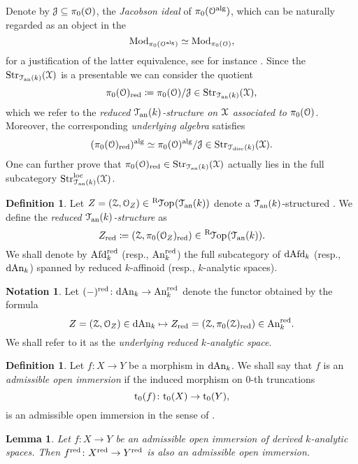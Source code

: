 \documentclass[10pt,a4paper,reqno]{amsart} %
\theoremstyle{plain}
\newtheorem{lem}[thm]{Lemma}
\theoremstyle{definition}
\newtheorem{defin}[thm]{Definition}
\newtheorem{notation}[thm]{Notation}
\theoremstyle{remark}
\numberwithin{equation}{section}
\begin{document}
Denote by $\mathcal J \subseteq \pi_0(\mathcal O)$, the \emph{Jacobson ideal} of $\pi_0(\mathcal O ^\mathrm{alg})$, which can be naturally regarded as an object
in the \infcat
    \[
        \mathrm{Mod}_{\pi_0(\mathcal O ^\mathrm{alg})} \simeq \mathrm{Mod}_{\pi_0(\mathcal O)},  
    \]
for a justification of the latter equivalence, see for instance \cite[Theorem 4.5]{Porta_Yu_Representability} .
Since the \infcat $\mathrm{Str}_{\mathcal T_{\mathrm{an}}(k)}(\mathcal X)$ is a presentable \infcat we can consider the quotient
    \[
        \pi_0(\mathcal O)_{\mathrm{red}} \coloneqq \pi_0(\mathcal O)/\mathcal J \in \mathrm{Str}_{\mathcal T_{\mathrm{an}}(k)}(\mathcal X)  ,
    \]
which we refer to the \emph{reduced $\mathcal T_{\mathrm{an}}(k)$-structure on $\mathcal X$ associated to $\pi_0(\mathcal O)$}. Moreover, the corresponding \emph{underlying algebra} satisfies
    \[(\pi_0(\mathcal O)_{\mathrm{red}})^\mathrm{alg} \simeq \pi_0(\mathcal O)^\mathrm{alg}/ \mathcal J \in \mathrm{Str}_{\mathcal T_{\mathrm{disc}}(k)}(\mathcal X).\]
One can further prove that
$\pi_0(\mathcal O)_{\mathrm{red}} \in \mathrm{Str}_{\mathcal T_{\mathrm{an}}(k)}(\mathcal X)$ actually lies in the full subcategory $\mathrm{Str}^\mathrm{loc}_{\mathcal T_{\mathrm{an}}(k)}(\mathcal X)$.

\begin{defin}
    Let $Z = (\cZ, \cO_Z) \in \RTop(\cTan(k))$ denote a $\mathcal T_{\mathrm{an}}(k)$-structured \inftopos. We define the \emph{reduced $\mathcal T_{\mathrm{an}}(k)$-structure \inftopos} as
        \[
            Z_\red \coloneqq (\cZ, \pi_0(\cO_Z)_\red) \in \RTop(\cTank).
        \]
    We shall denote by $\mathrm{Afd}_k^{\mathrm{red}}$ (resp., $\mathrm{An}_k^{\mathrm{red}}$) the full subcategory of $\mathrm{dAfd}_k$ (resp., $\mathrm{dAn}_k$)
    spanned by reduced $k$-affinoid (resp., $k$-analytic spaces).
\end{defin}

\begin{notation}
    Let $(-)^{\mathrm{red}} \colon \mathrm{dAn}_k \to \mathrm{An}_k^{\mathrm{red}}$ denote the functor obtained by the formula
        \[
            Z = (\mathcal Z, \mathcal O_Z) \in \mathrm{dAn}_k\mapsto Z_{\mathrm{red}} = (\mathcal Z, \pi_0(\mathcal Z)_{\mathrm{red}}) \in \mathrm{An}_k^{\mathrm{red}}.
        \]
    We shall refer to it as the \emph{underlying reduced $k$-analytic space}.
\end{notation}

\begin{defin}
    Let $f \colon X \to Y$ be a morphism in $\mathrm{dAn}_k$. We shall say that $f$ is an \emph{admissible open immersion} if the induced morphism on $0$-th truncations
        \[
            \mathrm{t}_0(f) \colon \mathrm{t}_0(X) \to \mathrm{t}_0(Y),  
        \]
    is an admissible open immersion in the sense of \cite[\S 1.3]{Berkovich_Etale_1993}.
\end{defin}


\begin{lem}
    Let $f \colon X \to Y$ be an admissible open immersion of derived $k$-analytic spaces. Then $f^{\mathrm{red}} \colon X^{\mathrm{red}} \to Y^{\mathrm{red}}$ is also
    an admissible open immersion.
\end{lem}
\end{document}
